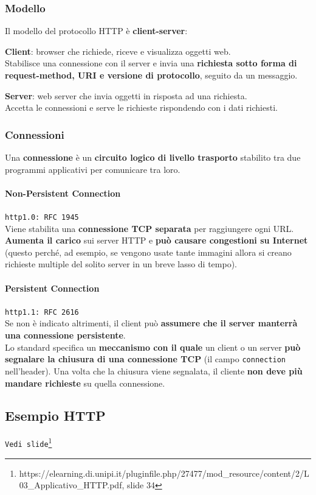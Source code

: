 \documentclass[10pt]{article}
\begin{document}
\subsubsection{Modello} Il modello del protocollo HTTP è \textbf{client-server}:
\begin{list}{}{}
\item \textbf{Client}: browser che richiede, riceve e visualizza oggetti web.\\Stabilisce una connessione con il server e invia una \textbf{richiesta sotto forma di request-method, URI e versione di protocollo}, seguito da un messaggio.
\item \textbf{Server}: web server che invia oggetti in risposta ad una richiesta.\\Accetta le connessioni e serve le richieste rispondendo con i dati richiesti.
\end{list}
\subsubsection{Connessioni} Una \textbf{connessione} è un \textbf{circuito logico di livello trasporto} stabilito tra due programmi applicativi per comunicare tra loro.
\paragraph{Non-Persistent Connection} \texttt{http1.0: RFC 1945}\\Viene stabilita una \textbf{connessione TCP separata} per raggiungere ogni URL. \textbf{Aumenta il carico} sui server HTTP e \textbf{può causare congestioni su Internet} (questo perché, ad esempio, se vengono usate tante immagini allora si creano richieste multiple del solito server in un breve lasso di tempo).
\paragraph{Persistent Connection} \texttt{http1.1: RFC 2616}\\Se non è indicato altrimenti, il client può \textbf{assumere che il server manterrà una connessione persistente}.\\Lo standard specifica un \textbf{meccanismo con il quale} un client o un server \textbf{può segnalare la chiusura di una connessione TCP} (il campo \texttt{connection} nell'header). Una volta che la chiusura viene segnalata, il cliente \textbf{non deve più mandare richieste} su quella connessione.
\subsection{Esempio HTTP}
\texttt{Vedi slide}\footnote{https://elearning.di.unipi.it/pluginfile.php/27477/mod\_resource/content/2/L03\_Applicativo\_HTTP.pdf, slide 34}
\end{document}
